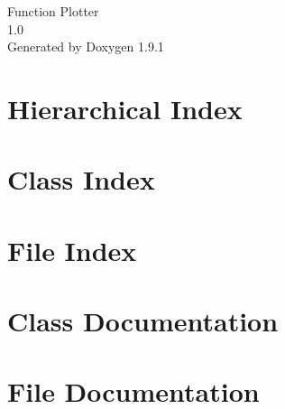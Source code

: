 \let\mypdfximage\pdfximage\def\pdfximage{\immediate\mypdfximage}\documentclass[twoside]{book}
\newcommand{\+}{\discretionary{\mbox{\scriptsize$\hookleftarrow$}}{}{}}
\newcommand{\clearemptydoublepage}{%
  \newpage{\pagestyle{empty}\cleardoublepage}%
}
\begin{document}
\raggedbottom

\hypersetup{pageanchor=false,
             bookmarksnumbered=true,
             pdfencoding=unicode
            }
\begin{titlepage}
\vspace*{7cm}
\begin{center}%
{\Large Function Plotter \\[1ex]\large 1.\+0 }\\
\vspace*{1cm}
{\large Generated by Doxygen 1.9.1}\\
\end{center}
\end{titlepage}
\clearemptydoublepage
{}
\tableofcontents
\clearemptydoublepage
{}
\hypersetup{pageanchor=true}

\chapter{Hierarchical Index}

\chapter{Class Index}

\chapter{File Index}

\chapter{Class Documentation}
















\chapter{File Documentation}



























\backmatter
\newpage
{}
\clearemptydoublepage
{}
\printindex
\end{document}
